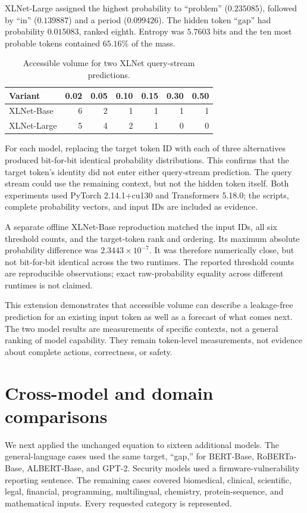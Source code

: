\documentclass[11pt,a4paper]{article}
\begin{document}
XLNet-Large assigned the highest probability to ``problem'' ($0.235085$), followed by ``in'' ($0.139887$) and a period ($0.099426$). The hidden token ``gap'' had probability $0.015083$, ranked eighth. Entropy was $5.7603$ bits and the ten most probable tokens contained $65.16\%$ of the mass.

\begin{table}[h]
\centering
\caption{Accessible volume for two XLNet query-stream predictions.}
\label{tab:xlnet}
\begin{tabular}{lrrrrrr}
\toprule
Variant & 0.02 & 0.05 & 0.10 & 0.15 & 0.30 & 0.50 \\
\midrule
XLNet-Base & 6 & 2 & 1 & 1 & 1 & 1 \\
XLNet-Large & 5 & 4 & 2 & 1 & 0 & 0 \\
\bottomrule
\end{tabular}
\end{table}

For each model, replacing the target token ID with each of three alternatives produced bit-for-bit identical probability distributions. This confirms that the target token's identity did not enter either query-stream prediction. The query stream could use the remaining context, but not the hidden token itself. Both experiments used PyTorch 2.14.1+cu130 and Transformers 5.18.0; the scripts, complete probability vectors, and input IDs are included as evidence.

A separate offline XLNet-Base reproduction matched the input IDs, all six threshold counts, and the target-token rank and ordering. Its maximum absolute probability difference was $2.3443\times10^{-7}$. It was therefore numerically close, but not bit-for-bit identical across the two runtimes. The reported threshold counts are reproducible observations; exact raw-probability equality across different runtimes is not claimed.

This extension demonstrates that accessible volume can describe a leakage-free prediction for an existing input token as well as a forecast of what comes next. The two model results are measurements of specific contexts, not a general ranking of model capability. They remain token-level measurements, not evidence about complete actions, correctness, or safety.

\section{Cross-model and domain comparisons}
We next applied the unchanged equation to sixteen additional models. The general-language cases used the same target, ``gap,'' for BERT-Base, RoBERTa-Base, ALBERT-Base, and GPT-2. Security models used a firmware-vulnerability reporting sentence. The remaining cases covered biomedical, clinical, scientific, legal, financial, programming, multilingual, chemistry, protein-sequence, and mathematical inputs. Every requested category is represented.
\end{document}
